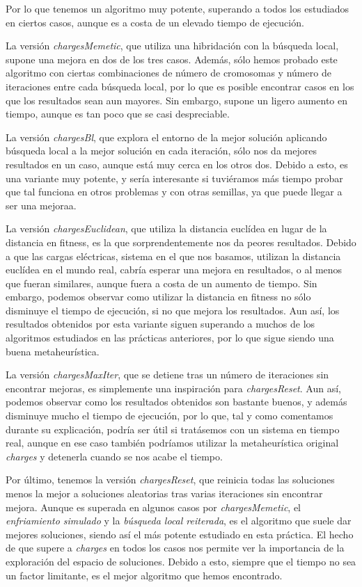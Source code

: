 \documentclass[11pt,a4paper]{article}
\begin{document}
Por lo que tenemos un algoritmo muy potente, superando a todos los estudiados en ciertos casos, aunque es a costa de un elevado tiempo de ejecución.

La versión \emph{chargesMemetic}, que utiliza una hibridación con la búsqueda local, supone una mejora en dos de los tres casos. Además, sólo hemos probado este algoritmo con ciertas combinaciones de número de cromosomas y número de iteraciones entre cada búsqueda local, por lo que es posible encontrar casos en los que los resultados sean aun mayores. Sin embargo, supone un ligero aumento en tiempo, aunque es tan poco que se casi despreciable.

La versión \emph{chargesBl}, que explora el entorno de la mejor solución aplicando búsqueda local a la mejor solución en cada iteración, sólo nos da mejores resultados en un caso, aunque está muy cerca en los otros dos. Debido a esto, es una variante muy potente, y sería interesante si tuviéramos más tiempo probar que tal funciona en otros problemas y con otras semillas, ya que puede llegar a ser una mejoraa.

La versión \emph{chargesEuclidean}, que utiliza la distancia euclídea en lugar de la distancia en fitness, es la que sorprendentemente nos da peores resultados. Debido a que las cargas eléctricas, sistema en el que nos basamos, utilizan la distancia euclídea en el mundo real, cabría esperar una mejora en resultados, o al menos que fueran similares, aunque fuera a costa de un aumento de tiempo. Sin embargo, podemos observar como utilizar la distancia en fitness no sólo disminuye el tiempo de ejecución, si no que mejora los resultados. Aun así, los resultados obtenidos por esta variante siguen superando a muchos de los algoritmos estudiados en las prácticas anteriores, por lo que sigue siendo una buena metaheurística.

La versión \emph{chargesMaxIter}, que se detiene tras un número de iteraciones sin encontrar mejoras, es simplemente una inspiración para \emph{chargesReset}. Aun así, podemos observar como los resultados obtenidos son bastante buenos, y además disminuye mucho el tiempo de ejecución, por lo que, tal y como comentamos durante su explicación, podría ser útil si tratásemos con un sistema en tiempo real, aunque en ese caso también podríamos utilizar la metaheurística original \emph{charges} y detenerla cuando se nos acabe el tiempo.

Por último, tenemos la versión \emph{chargesReset}, que reinicia todas las soluciones menos la mejor a soluciones aleatorias tras varias iteraciones sin encontrar mejora. Aunque es superada en algunos casos por \emph{chargesMemetic}, el \emph{enfriamiento simulado} y la \emph{búsqueda local reiterada}, es el algoritmo que suele dar mejores soluciones, siendo así el más potente estudiado en esta práctica. El hecho de que supere a \emph{charges} en todos los casos nos permite ver la importancia de la exploración del espacio de soluciones. Debido a esto, siempre que el tiempo no sea un factor limitante, es el mejor algoritmo que hemos encontrado.
\end{document}

